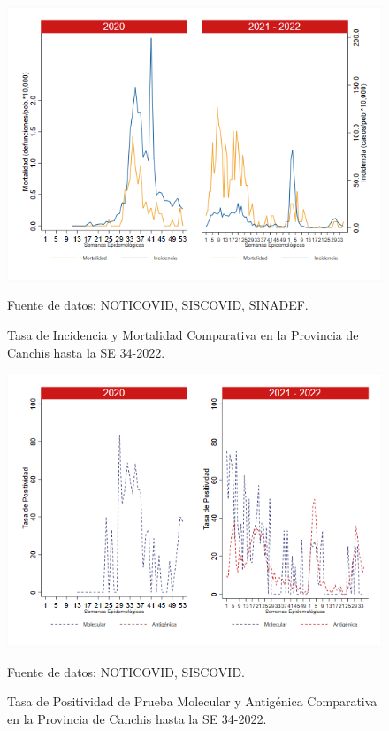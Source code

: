 \documentclass[12pt,a4paper,openany]{book}
\begin{document}
	\begin{figure}[h]
		\caption{Tasa de Incidencia y Mortalidad Comparativa en la Provincia de Canchis hasta la SE 34-2022.}\label{fig:inc_mort_canchis}
		\begin{center}
			\includegraphics[width=0.85\linewidth]{../figuras/incidencia_mortalidad_20_21_5.png}
		\end{center}
		{\footnotesize {Fuente de datos: NOTICOVID, SISCOVID, SINADEF.}}
	\end{figure}
	
	\begin{figure}[h]
		\caption{Tasa de Positividad de Prueba Molecular y Antigénica Comparativa en la Provincia de Canchis hasta la SE 34-2022.}\label{fig:positividad_canchis}
		\begin{center}
			\includegraphics[width=0.7\linewidth]{../figuras/positividad_20_21_5.png}
		\end{center}
		{\footnotesize {Fuente de datos: NOTICOVID, SISCOVID.}}
	\end{figure}
	
\end{document}
